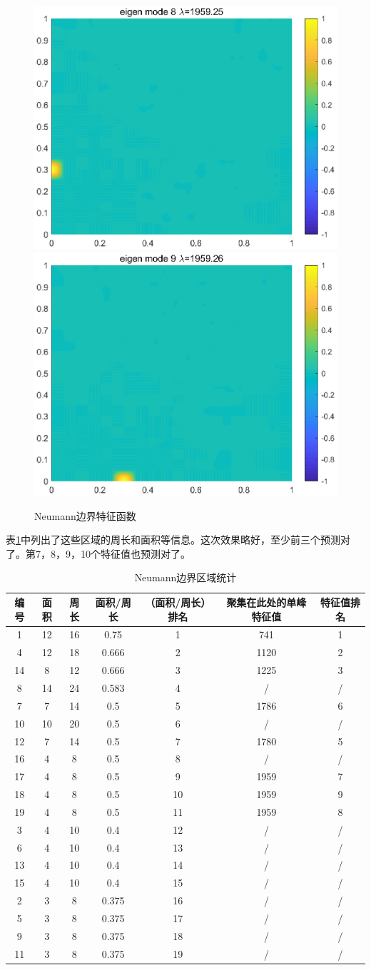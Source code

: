 \documentclass[12pt,a4paper]{article}
\begin{document}
\begin{figure}[htbp]
\includegraphics[width=0.3\linewidth]{pics/eigN8}
\includegraphics[width=0.3\linewidth]{pics/eigN9}
\caption{Neumann边界特征函数}
\label{eN}
\end{figure}

表\ref{tN}中列出了这些区域的周长和面积等信息。这次效果略好，至少前三个预测对了。第7，8，9，10个特征值也预测对了。

\begin{table}
\centering
\begin{tabular}{c|c|c|c|c|c|c}
\hline
编号 & 面积 & 周长 & 面积/周长 & （面积/周长）排名 & 聚集在此处的单峰特征值 & 特征值排名 \\
\hline
1 & 12 & 16 & 0.75 & 1 & 741 & 1 \\
4 & 12 & 18 & 0.666 & 2 & 1120 & 2 \\
14 & 8 & 12 & 0.666 & 3 & 1225 & 3 \\
8 & 14 & 24 & 0.583 & 4 & / & / \\
7 & 7 & 14 & 0.5 & 5 & 1786 & 6 \\
10 & 10 & 20 & 0.5 & 6 & / & / \\
12 & 7 & 14 & 0.5 & 7 & 1780 & 5 \\
16 & 4 & 8 & 0.5 & 8 & / & / \\
17 & 4 & 8 & 0.5 & 9 & 1959 & 7 \\
18 & 4 & 8 & 0.5 & 10 & 1959 & 9 \\
19 & 4 & 8 & 0.5 & 11 & 1959 & 8 \\
3 & 4 & 10 & 0.4 & 12 & / & / \\
6 & 4 & 10 & 0.4 & 13 & / & / \\
13 & 4 & 10 & 0.4 & 14 & / & / \\
15 & 4 & 10 & 0.4 & 15 & / & / \\
2 & 3 & 8 & 0.375 & 16 & / & / \\
5 & 3 & 8 & 0.375 & 17 & / & / \\
9 & 3 & 8 & 0.375 & 18 & / & / \\
11 & 3 & 8 & 0.375 & 19 & / & / \\
\hline 
\end{tabular}
\caption{Neumann边界区域统计}
\label{tN}
\end{table}
\end{document}
